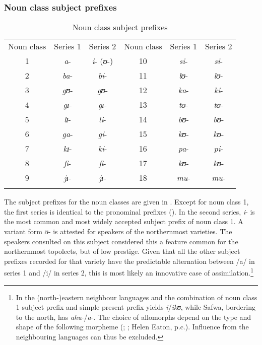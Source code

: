 \subsubsection{Noun class subject prefixes}\label{SubjectConcordsNCL}
\begin{table}[htb]
	\begin{center}
		\begin{tabular}{cccccc}
			\lsptoprule 
			\footnotesize{Noun class} & \footnotesize{Series 1} & \footnotesize{Series 2} & \footnotesize{Noun class} & \footnotesize{Series 1} & \footnotesize{Series 2}\\ 
			\cmidrule(r){1-3}\cmidrule(l){4-6}
			1 & \textit{a}- & \textit{i}- (\textit{ʊ}-) & 10 & \textit{si}- & \textit{si}-\\ 
			2 & \textit{ba}- & \textit{bi}- & 11 & \textit{lʊ}- & \textit{lʊ}-\\ 
			3 & \textit{gʊ}- & \textit{gʊ}- & 12 & \textit{ka}- & \textit{ki}-\\ 
			4 & \textit{gɪ}- & \textit{gɪ}- & 13 & \textit{tʊ}- & \textit{tʊ}-\\
			5 & \textit{lɪ}- & \textit{li}- & 14 & \textit{bʊ}- & \textit{bʊ}-\\
			6 & \textit{ga}- & \textit{gi}- & 15 & \textit{kʊ}- & \textit{kʊ}-\\
			7 & \textit{kɪ}- & \textit{ki}- & 16 & \textit{pa}- & \textit{pi}-\\
			8 & \textit{fi}- & \textit{fi}- & 17 & \textit{kʊ}- & \textit{kʊ}-\\
			9 & \textit{jɪ}- & \textit{jɪ}- & 18 & \textit{mu}- & \textit{mu}-\\
			\lspbottomrule
		\end{tabular} 
	\caption{Noun class subject prefixes}\label{tableSMNCL}
	
	\end{center}
\end{table}

The subject prefixes for the noun classes are given in . Except for noun class 1, the first series is identical to the pronominal prefixes (). In the second series, \textit{i}- is the most common and most widely accepted subject prefix of noun class 1. A variant form \textit{ʊ}- is attested for speakers of the northernmost varieties. The speakers consulted on this subject considered this a feature common for the northernmost topolects, but of low prestige. Given that all the other subject prefixes recorded for that variety have the predictable alternation between /a/ in series 1 and /i/ in series 2, this is most likely an innovative case of assimilation.\footnote{In the (north-)eastern neighbour languages  and  the combination of noun class 1 subject prefix and simple present prefix yields \textit{i}/\textit{ikʊ}, while Safwa, bordering to the north, has \textit{ahu}-/\textit{a}-. The choice of allomorphs depend on the type and shape of the following morpheme (\citealt{WolffR1905}; \citealt{VoorhoeveJsa}\relax; Helen Eaton, p.c.). Influence from the neighbouring languages can thus be excluded.}
